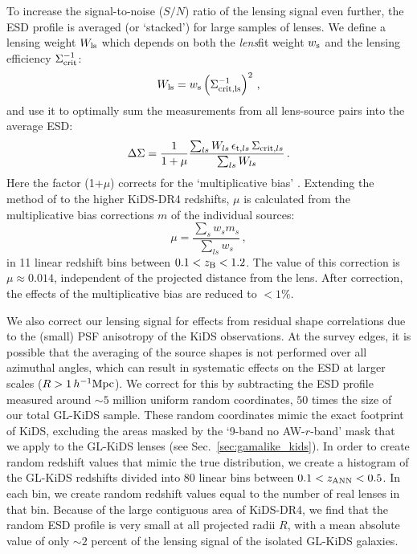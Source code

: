 \documentclass[usenatbib]{mnras}
\newcommand{\hMpc}{\, h^{-1}{\rm{Mpc}} }
\newcommand{\un}[1]{_{\rm #1}}
\begin{document}
To increase the signal-to-noise ($S/N$) ratio of the lensing signal even further, the ESD profile is averaged (or `stacked') for large samples of lenses. We define a lensing weight $W\un{ls}$ which depends on both the \emph{lens}fit weight $w\un{s}$ and the lensing efficiency $\Sigma\un{crit}^{-1}$:
\begin{equation}
	W\un{ls} = w\un{s} \left( \Sigma\un{crit,ls}^{-1} \right)^2 \, ,
	\label{eq:weights}
\end{equation}
and use it to optimally sum the measurements from all lens-source pairs into the average ESD:
\begin{equation}
	\Delta\Sigma = \frac{1}{1+\mu} \frac{\sum_{ls} W_{ls} \, \epsilon_{{\rm t},ls} \, \Sigma_{{\rm crit},ls} }{ \sum_{ls}{W_{ls}} }  \, .
	\label{eq:ESDmeasured}
\end{equation}
Here the factor (1+$\mu$) corrects for the `multiplicative bias' \cite[]{fenechconti2017}. Extending the method of \cite{dvornik2017} to the higher KiDS-DR4 redshifts, $\mu$ is calculated from the multiplicative bias corrections $m$ of the individual sources:
\begin{equation}
	\mu=\frac{\sum_{s} w_{s} m_{s}}{\sum_{ls} w_{s}} \, ,
	\label{eq:biascorr}
\end{equation}
in 11 linear redshift bins between \mbox{$0.1<z\un{B}<1.2$}. The value of this correction is $\mu\approx0.014$, independent of the projected distance from the lens. After correction, the effects of the multiplicative bias are reduced to $<1\%$.

We also correct our lensing signal for effects from residual shape correlations due to the (small) PSF anisotropy of the KiDS observations. At the survey edges, it is possible that the averaging of the source shapes is not performed over all azimuthal angles, which can result in systematic effects on the ESD at larger scales ($R>1\hMpc$). We correct for this by subtracting the ESD profile measured around $\sim5$ million uniform random coordinates, $50$ times the size of our total GL-KiDS sample. These random coordinates mimic the exact footprint of KiDS, excluding the areas masked by the `9-band no AW-$r$-band' mask that we apply to the GL-KiDS lenses (see Sec.~\ref{sec:gamalike_kids}). In order to create random redshift values that mimic the true distribution, we create a histogram of the GL-KiDS redshifts divided into $80$ linear bins between $0.1<z\un{ANN}<0.5$. In each bin, we create random redshift values equal to the number of real lenses in that bin. Because of the large contiguous area of KiDS-DR4, we find that the random ESD profile is very small at all projected radii $R$, with a mean absolute value of only $\sim2$ percent of the lensing signal of the isolated GL-KiDS galaxies. 
\end{document}
